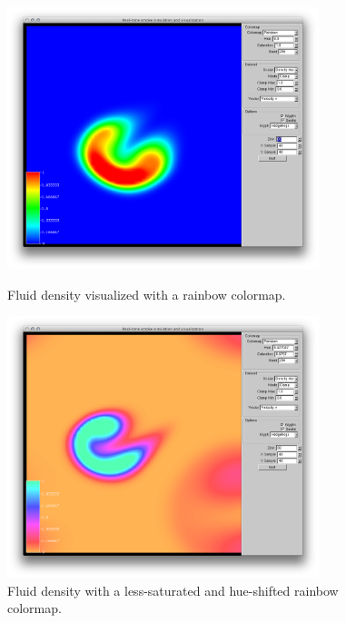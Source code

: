 \begin{figure}[htbp]
\centering
\begin{minipage}[t]{0.48\textwidth}
        \includegraphics[height=3in]{figures/colormaps/rainbowSmoke.png}
\caption{Fluid density visualized with a rainbow colormap.}
\label{fig:rainbowColormap}
\end{minipage}\hspace{.04\textwidth}%
\begin{minipage}[t]{0.48\textwidth}
        \includegraphics[height=3in]{figures/colormaps/hueAndSaturation.png}
    \caption{Fluid density with a less-saturated and hue-shifted rainbow colormap.}
    \label{fig:saturationAndHueColormap}
\end{minipage}
\end{figure}


